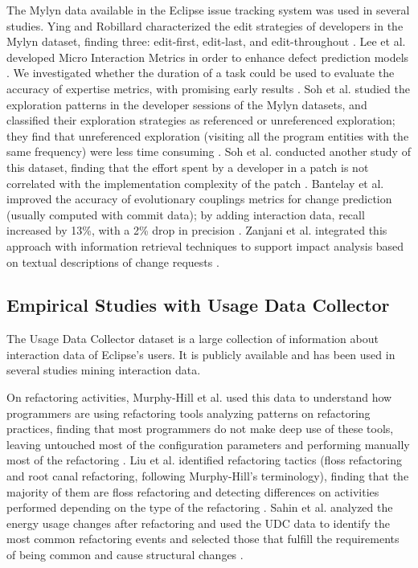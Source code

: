 \documentclass[times]{smrauth}
\begin{document}
The Mylyn data available in the Eclipse issue tracking system was used in several studies. Ying and Robillard characterized the edit strategies of developers in the Mylyn dataset, finding three: edit-first, edit-last, and edit-throughout \cite{YR11}. Lee et al. developed Micro Interaction Metrics in order to enhance defect prediction models \cite{LJD11}. We investigated whether the duration of a task could be used to evaluate the accuracy of expertise metrics, with promising early results \cite{RD13}. Soh et al. studied the exploration patterns in the developer sessions of the Mylyn datasets, and classified their exploration strategies as referenced or unreferenced exploration; they find that unreferenced exploration (visiting all the program entities with the same frequency) were less time consuming \cite{SKGAA13}. Soh et al. conducted another study of this dataset, finding that the effort spent by a developer in a patch is not correlated with the implementation complexity of the patch \cite{SKGA13}. Bantelay et al. improved the accuracy of evolutionary couplings metrics for change prediction (usually computed with commit data); by adding interaction data, recall increased by 13\%, with a 2\% drop in precision \cite{BZK13}. Zanjani et al. integrated this approach with information retrieval techniques to support impact analysis based on textual descriptions of change requests \cite{ZSK14}.

\subsection{Empirical Studies with Usage Data Collector}
The Usage Data Collector dataset is a large collection of information about interaction data of Eclipse's users. It is publicly available and has been used in several studies mining interaction data. 

On refactoring activities, Murphy-Hill et al. used this data to understand how programmers are using refactoring tools analyzing patterns on refactoring practices, finding that most programmers do not make deep use of these tools, leaving untouched most of the configuration parameters and performing manually most of the refactoring  \cite{MPB12}. Liu et al. identified refactoring tactics (floss refactoring and root canal refactoring, following Murphy-Hill's terminology), finding that the majority of them are floss refactoring and detecting differences on activities performed depending on the type of the refactoring \cite{LGN12}. Sahin et al. analyzed the energy usage changes after refactoring and used the UDC data to identify the most common refactoring events and selected those that fulfill the requirements of being common and cause structural changes \cite{SPC14}. 
\end{document}
